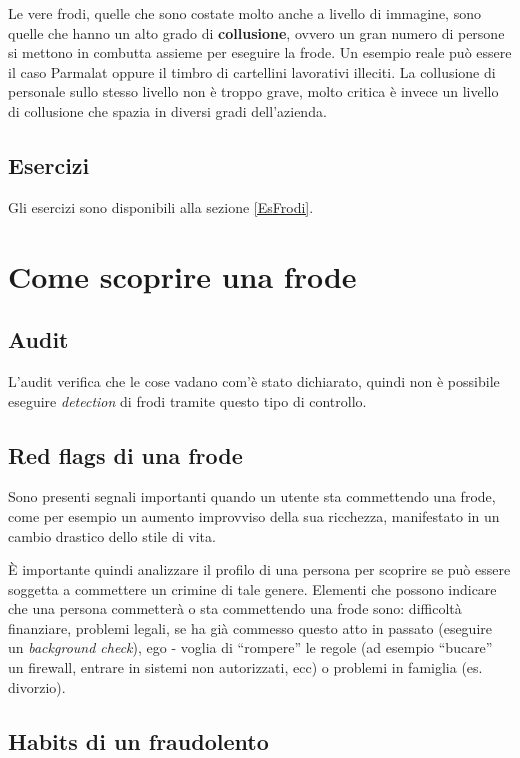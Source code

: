 Le vere frodi, quelle che sono costate molto anche a livello di immagine, sono
quelle che hanno un alto grado di \textbf{collusione}, ovvero un gran numero di
persone si mettono in combutta assieme per eseguire la frode. Un esempio 
reale può essere il caso Parmalat oppure il timbro di cartellini lavorativi 
illeciti. La collusione di personale sullo stesso livello non è troppo grave, 
molto critica è invece un livello di collusione che spazia in diversi gradi 
dell'azienda.

\subsection{Esercizi}

Gli esercizi sono disponibili alla sezione \ref{EsFrodi}.

\section{Come scoprire una frode}

\subsection{Audit}

L'audit verifica che le cose vadano com'è stato dichiarato, quindi non è
possibile eseguire \textit{detection} di frodi tramite questo tipo di controllo.

\subsection{Red flags di una frode}
Sono presenti segnali importanti quando un utente sta commettendo una frode,
come per esempio un aumento improvviso della sua ricchezza, manifestato
in un cambio drastico dello stile di vita.

È importante quindi analizzare il profilo di una persona per scoprire se può
essere soggetta a commettere un crimine di tale genere. Elementi che possono 
indicare che una persona commetterà o sta commettendo una frode sono:
difficoltà finanziare, problemi legali, se ha già commesso questo atto in 
passato (eseguire un \textit{background check}), ego - voglia di ``rompere'' 
le regole (ad esempio ``bucare'' un firewall, entrare in sistemi non 
autorizzati, ecc) o problemi in famiglia (es. divorzio).

\subsection{Habits di un fraudolento}

